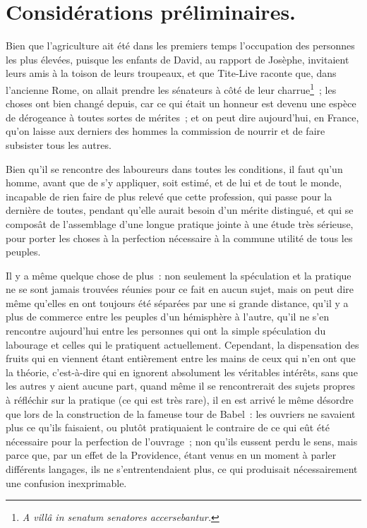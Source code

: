 \documentclass[french,twoside]{book} %
\begin{document}
\section[{Considérations préliminaires.}]{Considérations préliminaires.}
\noindent Bien que l’agriculture ait été dans les premiers temps l’occupation des personnes les plus élevées, puisque les enfants de David, au rapport de Josèphe, invitaient leurs amis à la toison de leurs troupeaux, et que Tite-Live raconte que, dans l’ancienne Rome, on allait prendre les sénateurs à côté de leur charrue\footnote{{\itshape A villâ in senatum senatores accersebantur.}} ; les choses ont bien changé depuis, car ce qui était un honneur est devenu une espèce de dérogeance à toutes sortes de mérites ; et on peut dire aujourd’hui, en France, qu’on laisse aux derniers des hommes la commission de nourrir et de faire subsister tous les autres.\par
Bien qu’il se rencontre des laboureurs dans toutes les conditions, il faut qu’un homme, avant que de s’y appliquer, soit estimé, et de lui et de tout le monde, incapable de rien faire de plus relevé que cette profession, qui passe pour la dernière de toutes, pendant qu’elle aurait besoin d’un mérite distingué, et qui se composât de l’assemblage d’une longue pratique jointe à une étude très sérieuse, pour porter les choses à la perfection nécessaire à la commune utilité de tous les peuples.\par
Il y a même quelque chose de plus : non seulement la spéculation et la pratique ne se sont jamais trouvées réunies pour ce fait en aucun sujet, mais on peut dire même qu’elles en ont toujours été séparées par une si grande distance, qu’il y a plus de commerce entre les peuples d’un hémisphère à l’autre, qu’il ne s’en rencontre aujourd’hui entre les personnes qui ont la simple spéculation du labourage et celles qui le pratiquent actuellement. Cependant, la dispensation des fruits qui en viennent étant entièrement entre les mains de ceux qui n’en ont que la théorie, c’est-à-dire qui en ignorent absolument les véritables intérêts, sans que les autres y aient aucune part, quand même il se rencontrerait des sujets propres à réfléchir sur la pratique (ce qui est très rare), il en est arrivé le même désordre que lors de la construction de la fameuse tour de Babel : les ouvriers ne savaient plus ce qu’ils faisaient, ou plutôt pratiquaient le contraire de ce qui eût été nécessaire pour la perfection de l’ouvrage ; non qu’ils eussent perdu le sens, mais parce que, par un effet de la Providence, étant venus en un moment à parler différents langages, ils ne s’entrentendaient plus, ce qui produisait nécessairement une confusion inexprimable.\par
\end{document}
